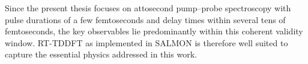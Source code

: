 Since the present thesis focuses on attosecond pump–probe spectroscopy with pulse durations of a few femtoseconds and delay times within several tens of femtoseconds, the key observables lie predominantly within this coherent validity window. RT-TDDFT as implemented in SALMON is therefore well suited to capture the essential physics addressed in this work.